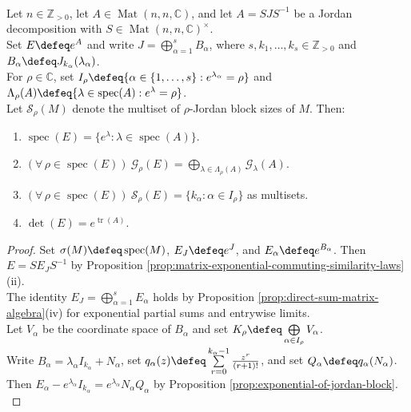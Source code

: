 \begin{theorem} \label{thm:matrix-exponential-spectral-mapping-jordan} \\
Let $n\in\mathbb{Z}_{>0}$, let $A\in\operatorname{Mat}(n,n,\mathbb{C})$, and let $A=SJS^{-1}$ be a Jordan decomposition with $S\in\operatorname{Mat}(n,n,\mathbb{C})^{\times}$.\\
Set $E\defeq e^A$ and write $J=\bigoplus\limits_{\alpha=1}^sB_{\alpha}$, where $s,k_1,\ldots,k_s\in\mathbb{Z}_{>0}$ and $B_{\alpha}\defeq J_{k_{\alpha}}(\lambda_{\alpha})$.\\
For $\rho\in\mathbb{C}$, set $I_{\rho}\defeq\{\alpha\in\{1,\ldots,s\}:e^{\lambda_{\alpha}}=\rho\}$ and $\Lambda_{\rho}(A)\defeq\{\lambda\in\operatorname{spec}(A):e^{\lambda}=\rho\}$.\\
Let $\mathcal{S}_{\rho}(M)$ denote the multiset of $\rho$-Jordan block sizes of $M$. Then:
\begin{enumerate}[label=(\roman*)]
\setlength{\itemsep}{0pt}
\item $\operatorname{spec}(E)=\{e^{\lambda}:\lambda\in\operatorname{spec}(A)\}$.
\item $(\forall\,\rho\in\operatorname{spec}(E))\ \mathcal{G}_{\rho}(E)=\bigoplus\limits_{\lambda\in\Lambda_{\rho}(A)}\mathcal{G}_{\lambda}(A)$.
\item $(\forall\,\rho\in\operatorname{spec}(E))\ \mathcal{S}_{\rho}(E)=\{k_{\alpha}:\alpha\in I_{\rho}\}$ as multisets.
\item $\det(E)=e^{\operatorname{tr}(A)}$.
\end{enumerate}
\begin{proof}
Set $\sigma(M)\defeq\operatorname{spec}(M)$, $E_J\defeq e^J$, and $E_{\alpha}\defeq e^{B_{\alpha}}$. Then $E=SE_JS^{-1}$ by Proposition \ref{prop:matrix-exponential-commuting-similarity-laws}(ii).\\
The identity $E_J=\bigoplus\limits_{\alpha=1}^sE_{\alpha}$ holds by Proposition \ref{prop:direct-sum-matrix-algebra}(iv) for exponential partial sums and entrywise limits.\\
Let $V_{\alpha}$ be the coordinate space of $B_{\alpha}$ and set $K_{\rho}\defeq\bigoplus\limits_{\alpha\in I_{\rho}}V_{\alpha}$.\\
Write $B_{\alpha}=\lambda_{\alpha}I_{k_{\alpha}}+N_{\alpha}$, set $q_{\alpha}(z)\defeq\sum\limits_{r=0}^{k_{\alpha}-1}\frac{z^r}{(r+1)!}$, and set $Q_{\alpha}\defeq q_{\alpha}(N_{\alpha})$. Then $E_{\alpha}-e^{\lambda_{\alpha}}I_{k_{\alpha}}=e^{\lambda_{\alpha}}N_{\alpha}Q_{\alpha}$ by Proposition \ref{prop:exponential-of-jordan-block}.\\

\end{proof}
\end{theorem}
